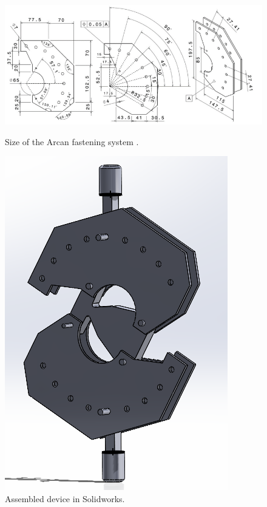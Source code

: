 \documentclass[3p,times,procedia]{elsarticle}
\begin{document}
\begin{figure}[htp]
	\begin{minipage}[c]{.46\linewidth}
		\centering
		\includegraphics[scale=0.4]{Figures/fig24}
		\caption{Size of the Arcan fastening system \citep{Odounga2018phd}.}
		\label{fig:Fig6}
	\end{minipage}
	\hfill%
	\begin{minipage}[c]{.46\linewidth}
		\centering
		\includegraphics[scale=0.4]{Figures/fig26}
		\caption{Assembled device in Solidworks.}
		\label{fig:Fig8}
	\end{minipage}
\end{figure}
\end{document}

